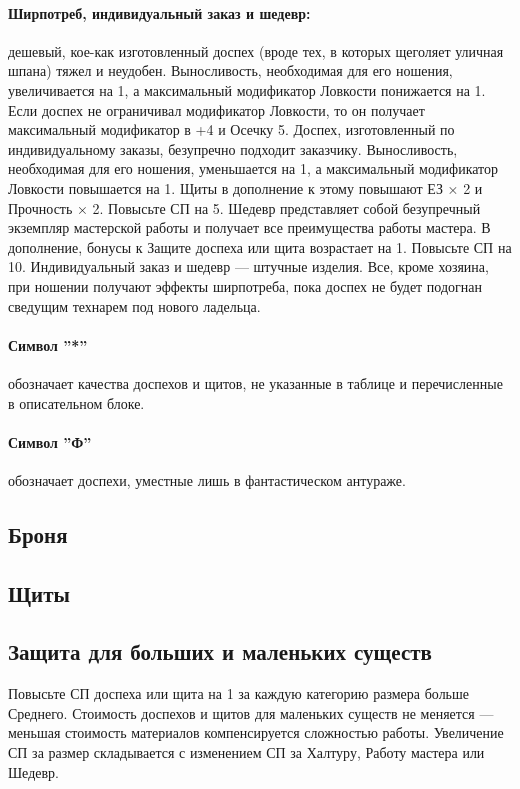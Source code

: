 \paragraph{Ширпотреб, индивидуальный заказ и шедевр:} дешевый, кое-как изготовленный доспех (вроде тех, в которых щеголяет уличная шпана) тяжел и неудобен. Выносливость, необходимая для его ношения, увеличивается на 1, а максимальный модификатор Ловкости понижается на 1. Если доспех не ограничивал модификатор Ловкости, то он получает максимальный модификатор в +4 и Осечку 5.
\newline
Доспех, изготовленный по индивидуальному заказы, безупречно подходит заказчику. Выносливость, необходимая для его ношения, уменьшается на 1, а максимальный модификатор Ловкости повышается на 1. Щиты в дополнение к этому повышают ЕЗ × 2 и Прочность × 2. Повысьте СП на 5.
\newline
Шедевр представляет собой безупречный экземпляр мастерской работы и получает все преимущества работы мастера. В дополнение, бонусы к Защите доспеха или щита возрастает на 1. Повысьте СП на 10.
\newline
Индивидуальный заказ и шедевр — штучные изделия. Все, кроме хозяина, при ношении получают эффекты ширпотреба, пока доспех не будет подогнан сведущим технарем под нового  ладельца.
\paragraph{Символ ''*''} обозначает качества доспехов и щитов, не указанные в таблице и перечисленные в описательном блоке.
\paragraph{Символ ''Ф''} обозначает доспехи, уместные лишь в фантастическом антураже.
\subsection{Броня}

\subsection{Щиты}


\subsection{Защита для больших и маленьких существ}
Повысьте СП доспеха или щита на 1 за каждую категорию размера больше Среднего. Стоимость доспехов и щитов для маленьких существ не меняется — меньшая стоимость материалов компенсируется сложностью работы. Увеличение СП за размер складывается с изменением СП за Халтуру, Работу мастера или Шедевр.

